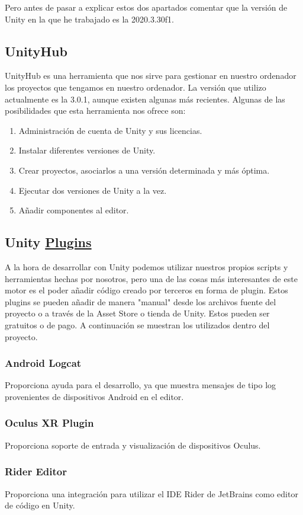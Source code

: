 Pero antes de pasar a explicar estos dos apartados comentar que la versión de Unity en la que he trabajado es la 2020.3.30f1.
\subsection{UnityHub}
UnityHub\cite{UnityHUB} es una herramienta que nos sirve para gestionar en nuestro ordenador los proyectos que tengamos en nuestro ordenador. La versión que utilizo actualmente es la 3.0.1, aunque existen algunas más recientes. Algunas de las posibilidades que esta herramienta nos ofrece son:
\begin{enumerate}
    \item Administración de cuenta de Unity y sus licencias.
    \item Instalar diferentes versiones de Unity.
    \item Crear proyectos, asociarlos a una versión determinada y más óptima.
    \item Ejecutar dos versiones de Unity a la vez. 
    \item Añadir componentes al editor.
\end{enumerate}
\subsection{Unity \underline{\textbf{Plugins}}}
A la hora de desarrollar con Unity podemos utilizar nuestros propios scripts y herramientas hechas por nosotros, pero una de las cosas más interesantes de este motor es el poder añadir código creado por terceros en forma de plugin. Estos plugins se pueden añadir de manera "manual" desde los archivos fuente del proyecto o a través de la Asset Store o tienda de Unity. Estos pueden ser gratuitos o de pago. A continuación se muestran los utilizados dentro del proyecto.
\subsubsection{Android Logcat}
Proporciona ayuda para el desarrollo, ya que muestra mensajes de tipo log provenientes de dispositivos Android en el editor.
\subsubsection{Oculus XR Plugin}
Proporciona soporte de entrada y visualización de dispositivos Oculus.
\subsubsection{Rider Editor}
Proporciona una integración para utilizar el IDE Rider de JetBrains como editor de código en Unity. 
